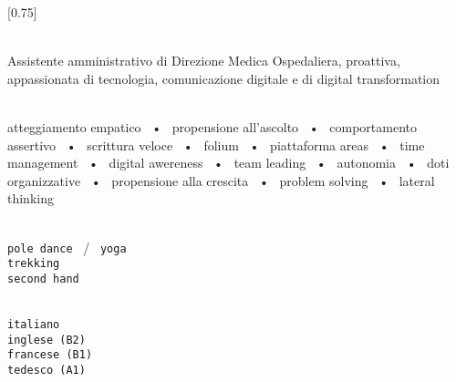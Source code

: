 \documentclass[withoutsidebar]{simple-hipster}
\begin{document}
\setlength{\columnsep}{1.5cm}
[0.75]
\begin{paracol}{2}

\paracolbackgroundoptions



\footnotesize
{\setasidefontcolour
\flushright
\begin{center}
\end{center}

\\[0.5em]

{
  \footnotesize
  Assistente amministrativo di Direzione Medica Ospedaliera, proattiva, appassionata di tecnologia, comunicazione digitale e di digital transformation
}
\bigskip

%
%
%

%
%



\bigskip

\\[0.5em]

atteggiamento empatico ~•~ propensione all'ascolto ~•~ comportamento assertivo ~•~ scrittura veloce ~•~ folium ~•~ piattaforma areas ~•~ time management ~•~ digital awereness ~•~ team leading ~•~ autonomia ~•~ doti organizzative ~•~ propensione alla crescita ~•~ problem solving ~•~ lateral thinking

\bigskip

\\[0.5em]

\texttt{pole dance} ~/~ \texttt{yoga} \\
\texttt{trekking} \\
\texttt{second hand} \\

\bigskip

\\[0.5em]

\texttt{italiano} \\
\texttt{inglese (B2)} \\
\texttt{francese (B1)} \\
\texttt{tedesco (A1)} \\

}
\end{paracol}
\end{document}
